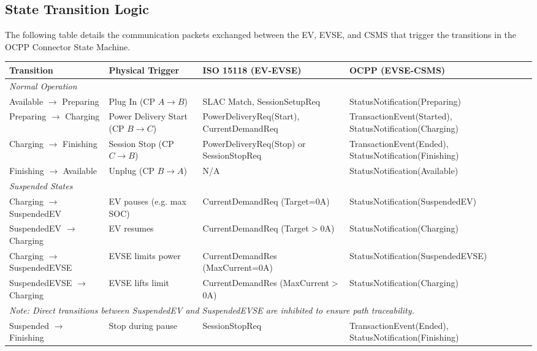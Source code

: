 \documentclass[a4paper,11pt]{report}
\begin{document}
\subsection{State Transition Logic}
The following table details the communication packets exchanged between the EV, EVSE, and CSMS that trigger the transitions in the OCPP Connector State Machine.

\small
\begin{longtable}{|p{3.0cm}|p{3.5cm}|p{4.5cm}|p{4.5cm}|}
\hline
\textbf{Transition} & \textbf{Physical Trigger} & \textbf{ISO 15118 (EV-EVSE)} & \textbf{OCPP (EVSE-CSMS)} \\
\hline
\multicolumn{4}{|l|}{\textit{Normal Operation}} \\
\hline
Available $\rightarrow$ Preparing & Plug In (CP $A \rightarrow B$) & SLAC Match, SessionSetupReq & StatusNotification(Preparing) \\
\hline
Preparing $\rightarrow$ Charging & Power Delivery Start (CP $B \rightarrow C$) & PowerDeliveryReq(Start), CurrentDemandReq & TransactionEvent(Started), StatusNotification(Charging) \\
\hline
Charging $\rightarrow$ Finishing & Session Stop (CP $C \rightarrow B$) & PowerDeliveryReq(Stop) or SessionStopReq & TransactionEvent(Ended), StatusNotification(Finishing) \\
\hline
Finishing $\rightarrow$ Available & Unplug (CP $B \rightarrow A$) & N/A & StatusNotification(Available) \\
\hline
\multicolumn{4}{|l|}{\textit{Suspended States}} \\
\hline
Charging $\rightarrow$ SuspendedEV & EV pauses (e.g. max SOC) & CurrentDemandReq (Target=0A) & StatusNotification(SuspendedEV) \\
\hline
SuspendedEV $\rightarrow$ Charging & EV resumes & CurrentDemandReq (Target$>$0A) & StatusNotification(Charging) \\
\hline
Charging $\rightarrow$ SuspendedEVSE & EVSE limits power & CurrentDemandRes (MaxCurrent=0A) & StatusNotification(SuspendedEVSE) \\
\hline
SuspendedEVSE $\rightarrow$ Charging & EVSE lifts limit & CurrentDemandRes (MaxCurrent$>$0A) & StatusNotification(Charging) \\
\hline
\multicolumn{4}{|l|}{\textit{Note: Direct transitions between SuspendedEV and SuspendedEVSE are inhibited to ensure path traceability.}} \\
\hline
Suspended $\rightarrow$ Finishing & Stop during pause & SessionStopReq & TransactionEvent(Ended), StatusNotification(Finishing) \\

\end{longtable}
\end{document}
